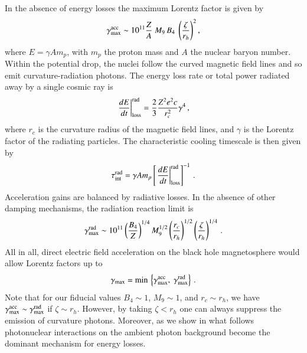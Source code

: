 \documentclass[aps,prd,twocolumn,superscriptaddress,tightenlines,nofootinbib]{revtex4-1}
\begin{document}
In the absence of energy losses the maximum  Lorentz factor is given by
\begin{equation}
\gamma_{\rm max}^{\rm acc} \sim 10^{11} \frac{Z}{A} \ M_9 \, B_4 \
\left(\frac{\zeta}{r_h} \right)^2 ,
\label{gamma-cr}
\end{equation}
where $E = \gamma A m_p$, with $m_p$ the proton mass and  $A$ the nuclear baryon number.
Within the potential drop, the nuclei  follow the curved magnetic
field lines and so emit curvature-radiation photons. The energy loss
rate or total power radiated away by a single cosmic ray is~\cite{Ochelkov} 
\begin{equation}
\left. \frac{d E}{dt} \right|_{\rm loss}^{\rm rad} = \frac{2}{3} \frac{Z^2 e^2 c}{r_c^2}
\gamma^4 \,,
\end{equation}
where $r_c$ is the curvature radius of the magnetic field lines, and
$\gamma$ is the Lorentz factor of the radiating particles. 
The characteristic cooling timescale is then given by
\begin{equation}
\tau_{\rm int}^{\rm rad}  =  \gamma A m_p  \left[\left. \frac{d
      E}{dt} \right|_{\rm loss}^{\rm rad} \right]^{-1}   \, .
\end{equation}
Acceleration gains are balanced by radiative losses. In the
absence of other damping mechanisms,  the radiation reaction limit
is~\cite{Levinson:2000nx,Levinson:2002ea} 
\begin{equation}
\gamma_{\rm max}^{\rm rad} \sim 10^{11} \left(\frac{B_4 }{Z} \right)^{1/4} M_9^{1/2}
\left(\frac{r_c}{r_h} \right)^{1/2}
\left(\frac{\zeta}{r_h}\right)^{1/4} \, .
\end{equation}
All in all, direct electric field acceleration on the black hole magnetosphere would allow Lorentz factors up to
\begin{equation}
\gamma_{\rm max} = {\rm min} \, \left\{\gamma_{\rm max}^{\rm acc}, \
\gamma_{\rm max}^{\rm rad} \right\}\, .
\end{equation}
Note that for our fiducial values $B_4 \sim 1$, $M_9 \sim 1$, and $r_c
\sim r_h$, we have $\gamma_{\rm max}^{\rm acc} \sim \gamma_{\rm
  max}^{\rm rad}$ if $\zeta \sim r_h$. However, by taking $\zeta <
r_h$ one can always suppress the emission of curvature photons.
Moreover, as we show in what follows photonuclear interactions on the
ambient photon background become the dominant mechanism for energy losses.
\end{document}
